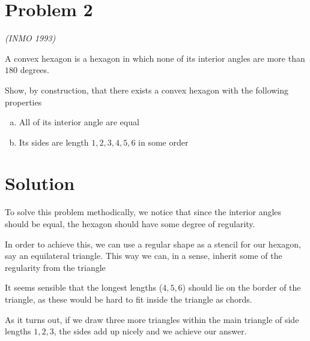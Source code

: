 \documentclass[12pt, letterpaper]{article}
\begin{document}
\section*{Problem 2}
\textit{(INMO 1993)}

A convex hexagon is a hexagon in which none of its interior angles are more than $180$ degrees.

Show, by construction, that there exists a convex hexagon with the following properties

\begin{enumerate}[(a)]
\item All of its interior angle are equal
\item Its sides are length $1,2,3,4,5,6$ in some order

\end{enumerate}

\newpage

\section*{Solution}
To solve this problem methodically, we notice that since the interior angles should be equal, the hexagon should have some degree of regularity. 

In order to achieve this, we can use a regular shape as a stencil for our hexagon, say an equilateral triangle. This way we can, in a sense, inherit some of the regularity from the triangle

It seems sensible that the longest lengths ($4,5,6$) should lie on the border of the triangle, as these would be hard to fit inside the triangle as chords.

As it turns out, if we draw three more triangles within the main triangle of side lengths $1,2,3$, the sides add up nicely and we achieve our answer.

\begin{center}
\end{center}
\end{document}
